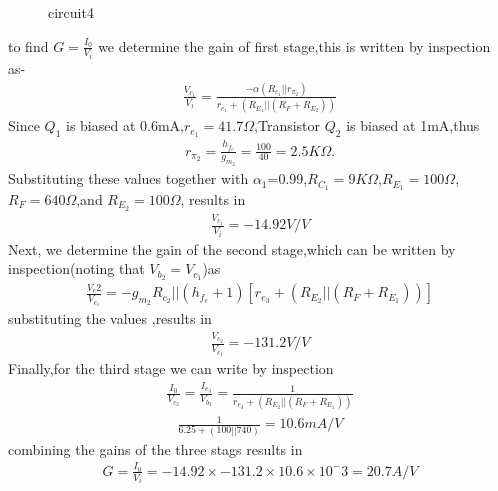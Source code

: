 \begin{enumerate}[label=\thesubsection.\arabic*.,ref=\thesubsection.\theenumi]
\begin{figure}[!ht]
\begin{center}
		\resizebox{\columnwidth}{!}{}
	\end{center}
\caption{circuit4}
\label{fig:circuit4}
\end{figure}
to find $G=\frac{I_0}{V_i}$ we determine the gain of first stage,this is written by inspection as-
\begin{align}
    \frac{V_c_1}{V_i}=\frac{-\alpha(R_c_1||r_\pi_2)}{r_e_1+(R_E_1||(R_F+R_E_2))}
\end{align}
Since $Q_1$ is biased at 0.6mA,$r_e_1=41.7\Omega$,Transistor $Q_2$ is biased at 1mA,thus
\begin{align}
r_\pi_2=\frac{h_f_e}{g_m_2}=\frac{100}{40}=2.5K\Omega.
\end{align}
 Substituting these values together with $\alpha_1$=0.99,$R_C_1=9K\Omega$,$R_E_1=100\Omega$,$R_F=640\Omega$,and $R_E_2=100\Omega$, results in 
\begin{align}
   \frac{V_c_1}{V_i}=-14.92V/V 
\end{align}
Next, we determine the gain of the second stage,which can be written by inspection(noting that $V_b_2=V_c_1$)as
{\small \begin{align}
    \frac{V_c2}{V_c_1}=-g_m_2{R_c_2||(h_f_e+1)[r_e_3+(R_E_2||(R_F+R_E_1))]}
\end{align}}%
substituting the values ,results in 
\begin{align}
    \frac{V_c_2}{V_c_1}=-131.2 V/V
\end{align}
Finally,for the third stage we can write by inspection
{\small \begin{align}
    \frac{I_0}{V_c_2}=\frac{I_e_3}{V_b_3}=\frac{1}{r_e_3+(R_E_2||(R_F+R_E_1))}
\end{align}}%
\begin{align}
    \frac{1}{6.25+(100||740)}=10.6mA/V
\end{align}
combining the gains of the three stags results in
{\small 
\begin{align}
G=\frac{I_0}{V_i}=-14.92\times-131.2\times10.6\times10^-3=20.7A/V    
\end{align}}%


\end{enumerate}
